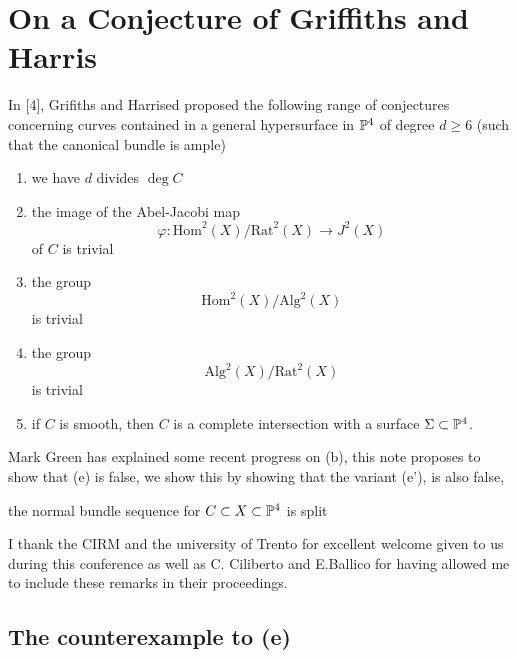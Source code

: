 \documentclass[12pt]{article}
\begin{document}
\newcommand{\g}[2]{\mathfrak{g}^{#1}_{#2}}

\section{On a Conjecture of Griffiths and Harris}

In [4], Grifiths and Harrised proposed the following range of conjectures concerning curves contained in a general hypersurface in $\P^4$ of degree $d \ge 6$ (such that the canonical bundle is ample)
\begin{enumerate}
\item we have $d$ divides $\deg{C}$
\item the image of the Abel-Jacobi map
\[ \varphi : \mathrm{Hom}^2(X) / \mathrm{Rat}^2(X) \to J^2(X) \]
of $C$ is trivial
\item the group
\[ \mathrm{Hom}^2(X) / \mathrm{Alg}^2(X) \]
is trivial
\item the group
\[ \mathrm{Alg}^2(X) / \mathrm{Rat}^2(X) \]
is trivial
\item if $C$ is smooth, then $C$ is a complete intersection with a surface $\Sigma \subset \P^4$. 
\end{enumerate}
Mark Green has explained some recent progress on (b), this note proposes to show that (e) is false, we show this by showing that the variant (e'), is also false,
\begin{center}
the normal bundle sequence for $C \subset X \subset \P^4$ is split
\end{center}
I thank the CIRM and the university of Trento for excellent welcome given to us during this conference as well as C. Ciliberto and E.Ballico for having allowed me to include these remarks in their proceedings.

\subsection{The counterexample to (e)}
\end{document}
